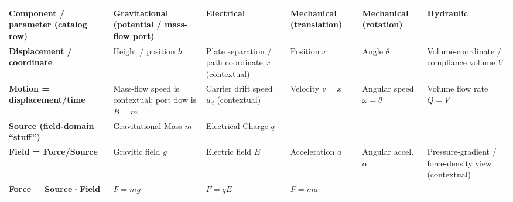 \documentclass[
  letterpaper,
  DIV=11,
  numbers=noendperiod]{scrartcl}
\begin{document}
\begin{longtable}[]{@{}
  >{\raggedright\arraybackslash}p{}
  >{\raggedright\arraybackslash}p{}
  >{\raggedright\arraybackslash}p{}
  >{\raggedright\arraybackslash}p{}
  >{\raggedright\arraybackslash}p{}
  >{\raggedright\arraybackslash}p{}@{}}
\toprule\noalign{}
\begin{minipage}[b]{\linewidth}\raggedright
Component / parameter (catalog row)
\end{minipage} & \begin{minipage}[b]{\linewidth}\raggedright
\textbf{Gravitational (potential / mass-flow port)}
\end{minipage} & \begin{minipage}[b]{\linewidth}\raggedright
\textbf{Electrical}
\end{minipage} & \begin{minipage}[b]{\linewidth}\raggedright
\textbf{Mechanical (translation)}
\end{minipage} & \begin{minipage}[b]{\linewidth}\raggedright
\textbf{Mechanical (rotation)}
\end{minipage} & \begin{minipage}[b]{\linewidth}\raggedright
\textbf{Hydraulic}
\end{minipage} \\
\midrule\noalign{}
\endhead
\bottomrule\noalign{}
\endlastfoot
\textbf{Displacement / coordinate} & Height / position \(h\) & Plate
separation / path coordinate \(x\) (contextual) & Position \(x\) & Angle
\(\theta\) & Volume-coordinate / compliance volume \(V\) \\
\textbf{Motion = displacement/time} & Mass-flow speed is contextual;
port flow is \(B=\dot m\) & Carrier drift speed \(u_d\) (contextual) &
Velocity \(v=\dot x\) & Angular speed \(\omega=\dot\theta\) & Volume
flow rate \(Q=\dot V\) \\
\textbf{Source (field-domain ``stuff'')} & Gravitational Mass \(m\) &
Electrical Charge \(q\) & --- & --- & --- \\
\textbf{Field = Force/Source} & Gravitic field \(g\) & Electric field
\(E\) & Acceleration \(a\) & Angular accel. \(\alpha\) &
Pressure-gradient / force-density view (contextual) \\
\textbf{Force = Source·Field} & \(F=mg\) & \(F=qE\) & \(F=ma\) &

\end{longtable}
\end{document}
